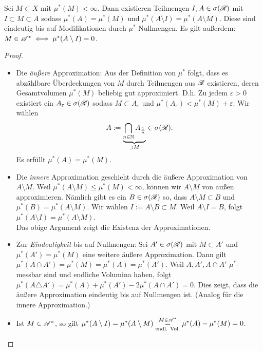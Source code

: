 \begin{satz}
\begin{mdframed}
Sei $M\subset X$ mit $\mu^*(M)<\infty$. Dann existieren Teilmengen $I, A\in \sigma (\RR)$ mit $I \subset M \subset A$ sodass $\mu^*(A) = \mu^*(M)$ und $\mu^*(A\setminus I) = \mu^*(A \setminus M)$. Diese sind eindeutig bis auf Modifikationen durch $\mu^*$-Nullmengen. Es gilt außerdem: $M \in \AA^* \iff \mu^*(A\setminus I)=0$.
\end{mdframed}
\begin{proof}\
\begin{itemize}
\item {Die \emph{äußere} Approximation:} Aus der Definition von $\mu^*$ folgt, dass es abzählbare Überdeckungen von $M$ durch Teilmengen aus $\RR$ existieren, deren Gesamtvolumen $\mu^*(M)$ beliebig gut approximiert. D.h. Zu jedem $\varepsilon>0$ existiert ein $A_\varepsilon \in \sigma(\RR)$ sodass $M\subset A_\varepsilon$ und $\mu^*(A_\varepsilon) < \mu^*(M)+\varepsilon$. Wir wählen $$A:=\underbrace{\bigcap_{n\in\N}A_{\frac{1}{n}}}_{\supset M} \in \sigma(\RR).$$
Es erfüllt $\mu^*(A)=\mu^*(M)$.
\item Die \emph{innere} Approximation geschieht durch die äußere Approximation von $A\setminus M$. Weil $\mu^*(A\setminus M) \leq \mu^*(M) < \infty$, können wir $A\setminus M$ von außen approximieren. Nämlich gibt es ein $B\in \sigma(\RR)$ so, dass $A\setminus M \subset B$ und $\mu^*(B)=\mu^*(A\setminus M)$. Wir wählen $I:= A \setminus B \subset M$. Weil $ A\setminus I =B$, folgt $\mu^*(A\setminus I) =\mu^*(A \setminus M)$.\\
Das obige Argument zeigt die Existenz der Approximationen.
\item Zur \emph{Eindeutigkeit} bis auf Nullmengen: Sei $A' \in \sigma (\RR)$ mit $M\subset A'$ und $\mu^*(A')=\mu^*(M)$ eine weitere äußere Approximation. Dann gilt $\mu^*(A \cap A') = \mu^*(M) =\mu^*(A) =\mu^*(A')$. Weil $A,A',A\cap A'$ $\mu^*$-messbar sind und endliche Volumina haben, folgt $\mu^*(A \triangle A') = \mu^*(A)+\mu^*(A')-2\mu^*(A\cap A') = 0$. Dies zeigt, dass die äußere Approximation eindeutig bis auf Nullmengen ist. (Analog für die innere Approximation.)
\item Ist $M \in \AA^*$, so gilt $\mu^*(A\setminus I) = \mu^*(A\setminus M) \underset{
\text{endl. Vol.}}{\overset{M \in \AA^*}=} \mu^*(A)-\mu^*(M)=0$. \\

\end{itemize}
\end{proof}
\end{satz}
